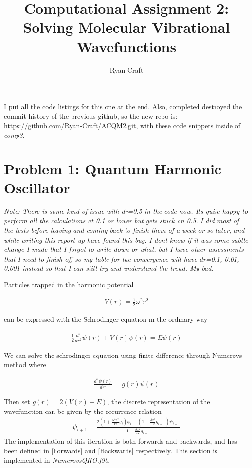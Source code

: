 \documentclass{article}
\begin{document}
\noindent
	\title{Computational Assignment 2: Solving Molecular Vibrational Wavefunctions}
	\author{Ryan Craft}
    \maketitle 
    
    I put all the code listings for this one at the end. Also, completed destroyed the commit history of the previous github, so the new repo is: \url{https://github.com/Ryan-Craft/ACQM2.git}, with these code snippets inside of \textit{comp3}. 
    
    \section{Problem 1: Quantum Harmonic Oscillator}
    
    \textit{Note: There is some kind of issue with dr=0.5 in the code now. Its quite happy to perform all the calculations at 0.1 or lower but gets stuck on 0.5. I did most of the tests before leaving and coming back to finish them of a week or so later, and while writing this report up have found this bug. I dont know if it was some subtle change I made that I forgot to write down or what, but I have other assessments that I need to finish off so my table for the convergence will have dr=0.1, 0.01, 0.001 instead so that I can still try and understand the trend. My bad.}
    
    Particles trapped in the harmonic potential
    
    \begin{gather}
    	V(r) = \frac{1}{2} \omega^2 r^2
    \end{gather}
    
    can be expressed with the Schrodinger equation in the ordinary way
    
    \begin{gather}
    	\frac{1}{2}\frac{d^2}{d r^2} \psi(r) + V(r)\psi(r) = E\psi(r)
    \end{gather}
    
    We can solve the schrodinger equation using finite difference through Numerovs method where 
    
    \begin{gather}
    	\frac{d^2\psi(r)}{d r^2} = g(r)\psi(r)
    \end{gather}
    
    Then set $g(r) = 2(V(r)-E)$, the discrete representation of the wavefunction can be given by the recurrence relation
    \large
    \begin{gather}
    	\psi_{i+1} = \frac{2(1+\frac{5\delta x^2}{12}g_i)\psi_i - (1-\frac{\delta x^2}{12}g_{i-1})\psi_{i-1}}{1-\frac{\delta x^2}{12}g_{i+1}}
    \end{gather}
    \normalsize
    The implementation of this iteration is both forwards and backwards, and has been defined in \ref{Forwards} and \ref{Backwards} respectively. This section is implemented in \textit{NumerovsQHO.f90}. 
    
\end{document}
